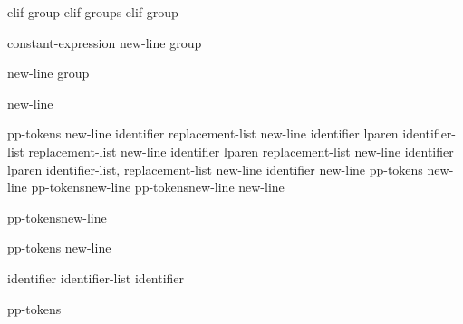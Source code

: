 \begin{bnf}
\br
    elif-group\br
    elif-groups elif-group
\end{bnf}

\begin{bnftab}
\br
\>\>\>constant-expression new-line group\opt
\end{bnftab}

\begin{bnftab}
\br
\>\>\>new-line group\opt
\end{bnftab}

\begin{bnftab}
\br
\>\>\>new-line
\end{bnftab}

\begin{bnftab}
\br
\>\>\>pp-tokens new-line\br
\>\>\>identifier replacement-list new-line\br
\>\>\>identifier lparen identifier-list\opt{} \terminal{)} replacement-list new-line\br
\>\>\>identifier lparen  replacement-list new-line\br
\>\>\>identifier lparen identifier-list,  replacement-list new-line\br
\>\>\>identifier new-line\br
\>\>\>pp-tokens new-line\br
\>\>\>pp-tokens\opt new-line\br
\>\>\>pp-tokens\opt new-line\br
\>\terminal{\# }new-line
\end{bnftab}

\begin{bnf}
\br
    pp-tokens\opt new-line
\end{bnf}

\begin{bnf}
\br
    pp-tokens new-line
\end{bnf}

\begin{bnf}
\br
\end{bnf}

\begin{bnf}
\br
    identifier\br
    identifier-list \terminal{,} identifier
\end{bnf}

\begin{bnf}
\br
    pp-tokens\opt
\end{bnf}

